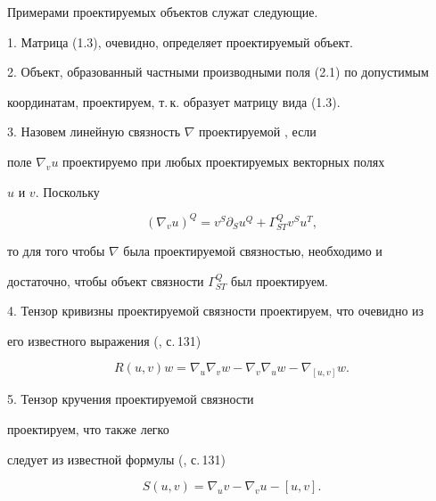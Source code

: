 Примерами проектируемых объектов служат следующие.





1. Матрица (1.3), очевидно, определяет проектируемый объект.





2. Объект, образованный частными производными поля (2.1) по допустимым


координатам, проектируем, т.\,к. образует матрицу вида (1.3).





3. Назовем линейную связность $\nabla$ проектируемой \cite{1}, если


поле $\nabla_v u$ проектируемо при любых проектируемых векторных полях


$u$ и $v$. Поскольку


\begin{equation}


(\nabla_v u)^Q=v^S \partial_S u^Q+\Gamma^Q_{ST}v^S u^T,


\end{equation}


то для того чтобы $\nabla$ была проектируемой связностью, необходимо и


достаточно, чтобы объект связности $\Gamma^Q_{ST}$ был проектируем.





4. Тензор кривизны проектируемой связности проектируем, что очевидно из


его известного выражения (\cite{2}, с.\,131)


\begin{equation}


R(u,v)w=\nabla_u\nabla_v w-\nabla_v\nabla_u w-


\nabla_{[u,v]}w.


\end{equation}





5. Тензор кручения проектируемой связности


проектируем, что также легко


следует из известной формулы (\cite{2}, с.\,131) 


\begin{equation}


S(u,v)=\nabla_u v-\nabla_v u-[u,v].


\end{equation}





